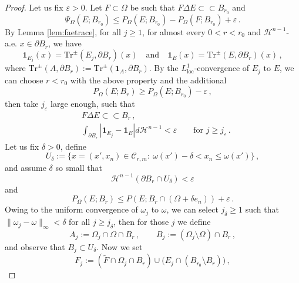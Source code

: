 \documentclass[10pt,a4paper]{amsart}
\newcommand{\Hau}{{\mathcal H}} %
\newcommand{\Tr}{{\mathrm{Tr}}}
\newcommand{\cC}{\mathcal{C}}
\newcommand{\ch}{\mathbf{1}}
\newcommand{\dd}{d}
\newcommand{\de}{\partial}
\newcommand{\difsim}{\Delta}
\newcommand{\e}{\varepsilon}
\newcommand{\loc}{\mathop{\mathrm{loc}}}
\newcommand{\pr}{P_{\Omega}}
\newcommand{\p}{P}
\begin{document}
\begin{proof}
Let us fix $\e > 0$. Let $F \subset \Omega$ be such that $F \difsim E \subset \subset B_{r_{0}}$ and
\begin{equation}\label{eq:PsiFcontroE}
 \Psi_{\Omega}(E;B_{r_{0}}) \le \pr(E;B_{r_{0}}) - \pr(F;B_{r_{0}}) + \e\, .
\end{equation}
By Lemma \ref{lem:faetrace}, for all $j \geq 1$, for almost every $0 < r < r_{0}$ and $\Hau^{n-1}$-a.e. $x\in \de B_{r}$, we have 
\begin{equation}\label{eq:equaltraces}
\ch_{E_{j}}(x) = \Tr^{\pm}(E_{j},\de B_{r})(x)\quad \text{and} \quad  \ch_{E}(x) = \Tr^{\pm}(E,\de B_{r})(x)\,,
\end{equation}
where $\Tr^{\pm}(A,\de B_{r}) := \Tr^{\pm}(\ch_A, \de B_{r})$. By the $L^{1}_{\loc}$-convergence of $E_{j}$ to $E$, we can choose $r<r_{0}$ with the above property and the additional
\begin{equation}\label{eq:perrrzero}
\pr(E;B_{r}) \ge \pr(E;B_{r_{0}}) - \e\,,
\end{equation}
then take $j_{\e}$ large enough, such that 
\begin{align} \label{eq:difcompr}
&F \difsim E \subset \subset B_{r}\,,\\\label{eq:tracesmall}
&\int_{\de B_{r}} |\ch_{E_{j}} - \ch_{E}| \dd \Hau^{n-1} <\e\qquad \text{for $j\ge j_{\e}$} \, .
\end{align}
Let us fix $\delta>0$, define
\[
U_\delta := \big\{x=(x',x_{n})\in \cC_{r,m}:\ \omega(x')-\delta < x_{n}\le \omega(x')\big\}\,,
\]
and assume $\delta$ so small that 
\begin{equation}\label{eq:Haudeltaeps}
\Hau^{n-1}(\de B_{r}\cap U_{\delta})<\e
\end{equation}
and
\begin{equation}\label{eq:peromegadelta}
\pr(E;B_{r}) \le \p(E;B_{r}\cap(\Omega + \delta e_{n})) + \e\,.
\end{equation}
Owing to the uniform convergence of $\omega_{j}$ to $\omega$, we can select $j_\delta \geq 1$ such that $\|\omega_{j}-\omega\|_{\infty} <\delta$ for all $j\ge j_{\delta}$, then for those $j$ we define
\begin{equation*}
A_j := \Omega_{j} \cap \Omega \cap B_r \, , \qquad B_j := (\Omega_{j} \setminus \Omega) \cap B_r \,,
\end{equation*}
and observe that $B_j \subset U_\delta$. Now we set
\begin{equation} \label{eq:Fj}
F_{j} := (\tilde{F} \cap \Omega_{j} \cap B_r) \cup \big(E_{j} \cap (B_{r_{0}} \setminus B_{r})\big) \,,

\end{equation}
\end{proof}
\end{document}
